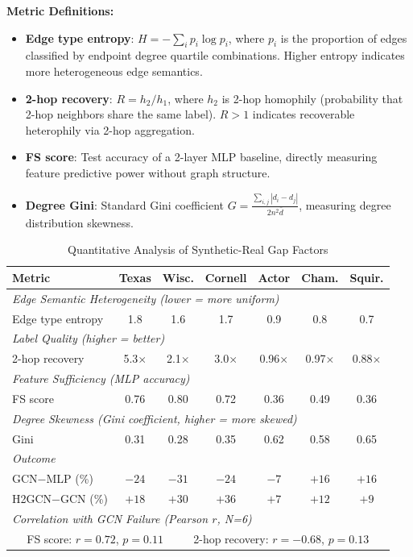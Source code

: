 \textbf{Metric Definitions:}
\begin{itemize}
    \item \textbf{Edge type entropy}: $H = -\sum_i p_i \log p_i$, where $p_i$ is the proportion of edges classified by endpoint degree quartile combinations. Higher entropy indicates more heterogeneous edge semantics.
    \item \textbf{2-hop recovery}: $R = h_2 / h_1$, where $h_2$ is 2-hop homophily (probability that 2-hop neighbors share the same label). $R > 1$ indicates recoverable heterophily via 2-hop aggregation.
    \item \textbf{FS score}: Test accuracy of a 2-layer MLP baseline, directly measuring feature predictive power without graph structure.
    \item \textbf{Degree Gini}: Standard Gini coefficient $G = \frac{\sum_{i,j}|d_i - d_j|}{2n^2\bar{d}}$, measuring degree distribution skewness.
\end{itemize}

\begin{table}[h]
\centering
\caption{Quantitative Analysis of Synthetic-Real Gap Factors}
\label{tab:gap_factors}
\small
\begin{tabular}{@{}lcccccc@{}}
\toprule
\textbf{Metric} & \textbf{Texas} & \textbf{Wisc.} & \textbf{Cornell} & \textbf{Actor} & \textbf{Cham.} & \textbf{Squir.} \\
\midrule
\multicolumn{7}{l}{\textit{Edge Semantic Heterogeneity (lower = more uniform)}} \\
Edge type entropy & 1.8 & 1.6 & 1.7 & 0.9 & 0.8 & 0.7 \\
\midrule
\multicolumn{7}{l}{\textit{Label Quality (higher = better)}} \\
2-hop recovery & 5.3$\times$ & 2.1$\times$ & 3.0$\times$ & 0.96$\times$ & 0.97$\times$ & 0.88$\times$ \\
\midrule
\multicolumn{7}{l}{\textit{Feature Sufficiency (MLP accuracy)}} \\
FS score & 0.76 & 0.80 & 0.72 & 0.36 & 0.49 & 0.36 \\
\midrule
\multicolumn{7}{l}{\textit{Degree Skewness (Gini coefficient, higher = more skewed)}} \\
Gini & 0.31 & 0.28 & 0.35 & 0.62 & 0.58 & 0.65 \\
\midrule
\multicolumn{7}{l}{\textit{Outcome}} \\
GCN$-$MLP (\%) & $-24$ & $-31$ & $-24$ & $-7$ & $+16$ & $+16$ \\
H2GCN$-$GCN (\%) & $+18$ & $+30$ & $+36$ & $+7$ & $+12$ & $+9$ \\
\midrule
\multicolumn{7}{l}{\textit{Correlation with GCN Failure (Pearson $r$, N=6)}} \\
\multicolumn{7}{c}{FS score: $r = 0.72$, $p = 0.11$ ~~~~ 2-hop recovery: $r = -0.68$, $p = 0.13$} \\
\bottomrule
\end{tabular}
\end{table}

